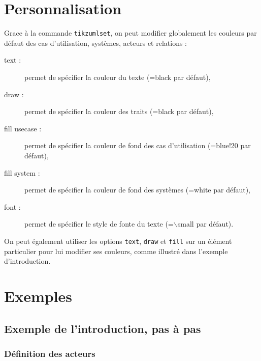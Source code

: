 \documentclass[a4paper,11pt]{report}
\newcommand{\inputTikZ}[1]{%
  }%
\newcommand{\inputTikZ}[1]{%
    \texttt{[image: fig/\#1.pdf]}%
  }%
\begin{document}
\medskip

\begin{minipage}{0.51\textwidth}

\end{minipage}
\begin{minipage}{0.49\textwidth}
\begin{center}
\inputTikZ{figure46}
\end{center}
\end{minipage}

\medskip

\section{Personnalisation}\label{s.fitusecase}

Grace à la commande {\tt tikzumlset}, on peut modifier globalement les couleurs par défaut des cas d'utilisation, systèmes, acteurs et relations :

\begin{description}
\item[text :] permet de spécifier la couleur du texte (=black par défaut),
\item[draw :] permet de spécifier la couleur des traits (=black par défaut),
\item[fill usecase :] permet de spécifier la couleur de fond des cas d'utilisation (=blue!20 par défaut),
\item[fill system :] permet de spécifier la couleur de fond des systèmes (=white par défaut),
\item[font :] permet de spécifier le style de fonte du texte (=$\backslash$small par défaut).
\end{description}

On peut également utiliser les options {\tt text}, {\tt draw} et {\tt fill} sur un élément particulier pour lui modifier ses couleurs, comme illustré dans l'exemple d'introduction.

\section{Exemples}

\subsection{Exemple de l'introduction, pas à pas}

\subsubsection{Définition des acteurs}
\end{document}
